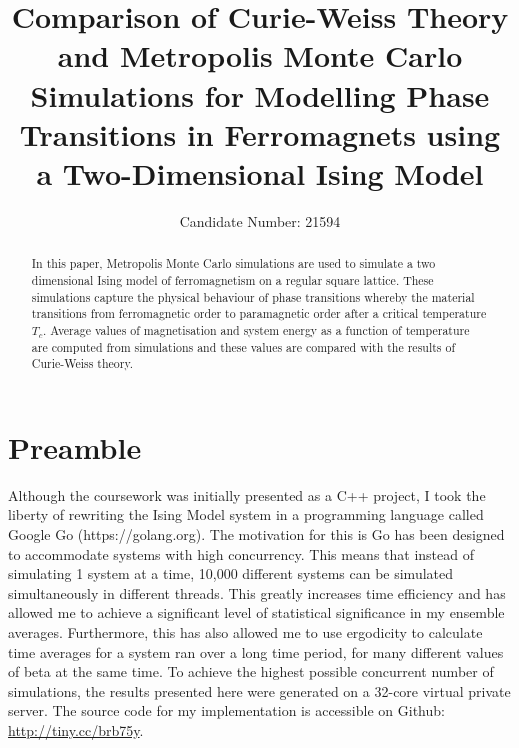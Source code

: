 \documentclass[11pt]{iopart}
\begin{document}
\section*{Preamble}
Although the coursework was initially presented as a C++ project, I took the liberty of rewriting the Ising Model system in a programming language called Google Go (https://golang.org). The motivation for this is Go has been designed to accommodate systems with high concurrency. This means that instead of simulating 1 system at a time, 10,000 different systems can be simulated simultaneously in different threads. This greatly increases time efficiency and has allowed me to achieve a significant level of statistical significance in my ensemble averages. Furthermore, this has also allowed me to use ergodicity to calculate time averages for a system ran over a long time period, for many different values of beta at the same time. To achieve the highest possible concurrent number of simulations, the results presented here were generated on a 32-core virtual private server. The source code for my implementation is accessible on Github: \url{http://tiny.cc/brb75y}.\cleardoublepage

\setlength{\marginparwidth}{1.5cm}

\title[]{Comparison of Curie-Weiss Theory and Metropolis Monte Carlo Simulations for Modelling Phase Transitions in Ferromagnets using a Two-Dimensional Ising Model}

\author{Candidate Number: 21594}

\address{Department of Physics,
University of Bath, Bath BA2 7AY, United Kingdom}
\begin{abstract}
In this paper, Metropolis Monte Carlo simulations are used to simulate a two dimensional Ising model of ferromagnetism on a regular square lattice. These simulations capture the physical behaviour of phase transitions whereby the material transitions from ferromagnetic order to paramagnetic order after a critical temperature $T_c$. Average values of magnetisation and system energy as a function of temperature are computed from simulations and these values are compared with the results of Curie-Weiss theory.
\end{abstract}


\end{document}
